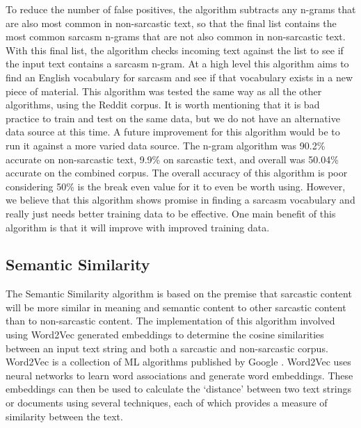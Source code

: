 \documentclass[conference]{IEEEtran}
\begin{document}
To reduce the number of false positives, the algorithm subtracts any n-grams that are also most common in non-sarcastic text, so that the final list contains the most common sarcasm n-grams that are not also common in non-sarcastic text. With this final list, the algorithm checks incoming text against the list to see if the input text contains a sarcasm n-gram. At a high level this algorithm aims to find an English vocabulary for sarcasm and see if that vocabulary exists in a new piece of material. This algorithm was tested the same way as all the other algorithms, using the Reddit corpus. It is worth mentioning that it is bad practice to train and test on the same data, but we do not have an alternative data source at this time. A future improvement for this algorithm would be to run it against a more varied data source. The n-gram algorithm was 90.2\% accurate on non-sarcastic text, 9.9\% on sarcastic text, and overall was 50.04\% accurate on the combined corpus. The overall accuracy of this algorithm is poor considering 50\% is the break even value for it to even be worth using. However, we believe that this algorithm shows promise in finding a sarcasm vocabulary and really just needs better training data to be effective. One main benefit of this algorithm is that it will improve with improved training data.\\
\subsection{Semantic Similarity}
The Semantic Similarity algorithm is based on the premise that sarcastic content will be more similar in meaning and semantic content to other sarcastic content than to non-sarcastic content.  The implementation of this algorithm involved using Word2Vec generated embeddings to determine the cosine similarities between an input text string and both a sarcastic and non-sarcastic corpus.  Word2Vec is a collection of ML algorithms published by Google \cite{b6}. Word2Vec uses neural networks to learn word associations and generate word embeddings.  These embeddings can then be used to calculate the ‘distance’ between two text strings or documents using several techniques, each of which provides a measure of similarity between the text.  \\
\end{document}
